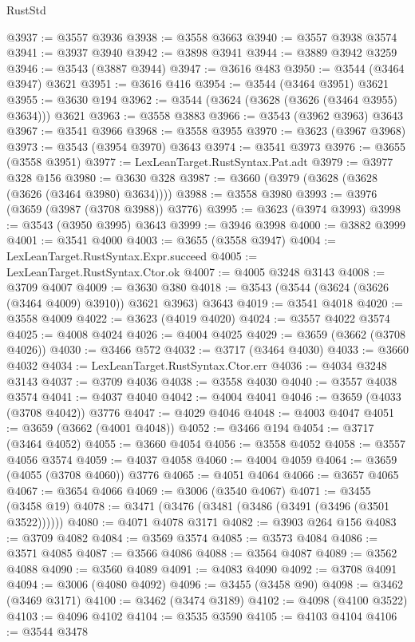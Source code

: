 \begin{lexlean}{RustStd}
\begin{coremodule}
@3937 := @3557 @3936
@3938 := @3558 @3663
@3940 := @3557 @3938 @3574
@3941 := @3937 @3940
@3942 := @3898 @3941
@3944 := @3889 @3942 @3259
@3946 := @3543 (@3887 @3944)
@3947 := @3616 @483
@3950 := @3544 (@3464 @3947) @3621
@3951 := @3616 @416
@3954 := @3544 (@3464 @3951) @3621
@3955 := @3630 @194
@3962 := @3544 (@3624 (@3628 (@3626 (@3464 @3955) @3634))) @3621
@3963 := @3558 @3883
@3966 := @3543 (@3962 @3963) @3643
@3967 := @3541 @3966
@3968 := @3558 @3955
@3970 := @3623 (@3967 @3968)
@3973 := @3543 (@3954 @3970) @3643
@3974 := @3541 @3973
@3976 := @3655 (@3558 @3951)
@3977 := LexLeanTarget.RustSyntax.Pat.adt
@3979 := @3977 @328 @156
@3980 := @3630 @328
@3987 := @3660 (@3979 (@3628 (@3628 (@3626 (@3464 @3980) @3634))))
@3988 := @3558 @3980
@3993 := @3976 (@3659 (@3987 (@3708 @3988)) @3776)
@3995 := @3623 (@3974 @3993)
@3998 := @3543 (@3950 @3995) @3643
@3999 := @3946 @3998
@4000 := @3882 @3999
@4001 := @3541 @4000
@4003 := @3655 (@3558 @3947)
@4004 := LexLeanTarget.RustSyntax.Expr.succeed
@4005 := LexLeanTarget.RustSyntax.Ctor.ok
@4007 := @4005 @3248 @3143
@4008 := @3709 @4007
@4009 := @3630 @380
@4018 := @3543 (@3544 (@3624 (@3626 (@3464 @4009) @3910)) @3621 @3963) @3643
@4019 := @3541 @4018
@4020 := @3558 @4009
@4022 := @3623 (@4019 @4020)
@4024 := @3557 @4022 @3574
@4025 := @4008 @4024
@4026 := @4004 @4025
@4029 := @3659 (@3662 (@3708 @4026))
@4030 := @3466 @572
@4032 := @3717 (@3464 @4030)
@4033 := @3660 @4032
@4034 := LexLeanTarget.RustSyntax.Ctor.err
@4036 := @4034 @3248 @3143
@4037 := @3709 @4036
@4038 := @3558 @4030
@4040 := @3557 @4038 @3574
@4041 := @4037 @4040
@4042 := @4004 @4041
@4046 := @3659 (@4033 (@3708 @4042)) @3776
@4047 := @4029 @4046
@4048 := @4003 @4047
@4051 := @3659 (@3662 (@4001 @4048))
@4052 := @3466 @194
@4054 := @3717 (@3464 @4052)
@4055 := @3660 @4054
@4056 := @3558 @4052
@4058 := @3557 @4056 @3574
@4059 := @4037 @4058
@4060 := @4004 @4059
@4064 := @3659 (@4055 (@3708 @4060)) @3776
@4065 := @4051 @4064
@4066 := @3657 @4065
@4067 := @3654 @4066
@4069 := @3006 (@3540 @4067)
@4071 := @3455 (@3458 @19)
@4078 := @3471 (@3476 (@3481 (@3486 (@3491 (@3496 (@3501 @3522))))))
@4080 := @4071 @4078 @3171
@4082 := @3903 @264 @156
@4083 := @3709 @4082
@4084 := @3569 @3574
@4085 := @3573 @4084
@4086 := @3571 @4085
@4087 := @3566 @4086
@4088 := @3564 @4087
@4089 := @3562 @4088
@4090 := @3560 @4089
@4091 := @4083 @4090
@4092 := @3708 @4091
@4094 := @3006 (@4080 @4092)
@4096 := @3455 (@3458 @90)
@4098 := @3462 (@3469 @3171)
@4100 := @3462 (@3474 @3189)
@4102 := @4098 (@4100 @3522)
@4103 := @4096 @4102
@4104 := @3535 @3590
@4105 := @4103 @4104
@4106 := @3544 @3478

\end{coremodule}
\end{lexlean}

